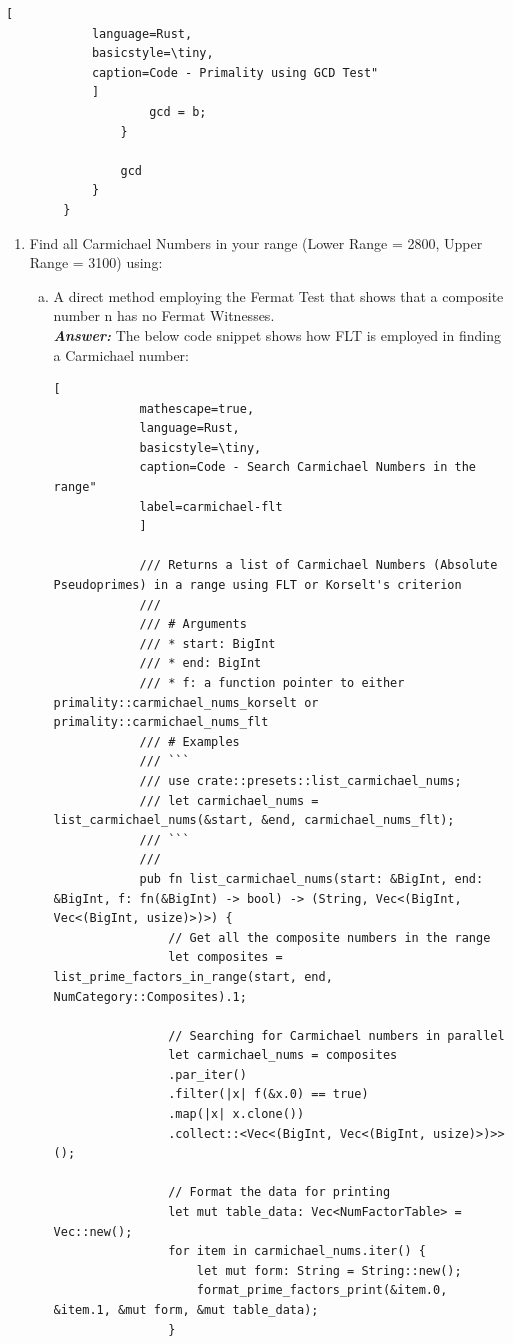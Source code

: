 \documentclass[11pt,a4paper]{article}
\begin{document}
\begin{enumerate}[1.]
\begin{flushleft}
\begin{lstlisting}[
			language=Rust, 
			basicstyle=\tiny, 
			caption=Code - Primality using GCD Test"  
			]
					gcd = b;
				}
				
				gcd
			}
		}
		\end{lstlisting}
		
		\end{flushleft}
		\bigskip
	
	\begin{enumerate}[2.]
		\item Find all Carmichael Numbers in your range (Lower Range = 2800, Upper Range = 3100) using:

	
	\begin{flushleft}
		\medskip
		\begin{enumerate}[(a)]
			\item A direct method employing the Fermat Test that shows that a composite number n has no Fermat Witnesses. \\
			\medskip
			\textbf{\textit{Answer:}} The below code snippet shows how FLT is employed in finding a Carmichael number:
		
			\begin{lstlisting}[
			mathescape=true,
			language=Rust, 
			basicstyle=\tiny,
			caption=Code - Search Carmichael Numbers in the range"
			label=carmichael-flt  
			]
			
			/// Returns a list of Carmichael Numbers (Absolute Pseudoprimes) in a range using FLT or Korselt's criterion
			///
			/// # Arguments
			/// * start: BigInt
			/// * end: BigInt
			/// * f: a function pointer to either primality::carmichael_nums_korselt or primality::carmichael_nums_flt
			/// # Examples
			/// ```
			/// use crate::presets::list_carmichael_nums;
			/// let carmichael_nums = list_carmichael_nums(&start, &end, carmichael_nums_flt);
			/// ```
			///
			pub fn list_carmichael_nums(start: &BigInt, end: &BigInt, f: fn(&BigInt) -> bool) -> (String, Vec<(BigInt, Vec<(BigInt, usize)>)>) {
				// Get all the composite numbers in the range
				let composites = list_prime_factors_in_range(start, end, NumCategory::Composites).1;
				
				// Searching for Carmichael numbers in parallel
				let carmichael_nums = composites
				.par_iter()
				.filter(|x| f(&x.0) == true)
				.map(|x| x.clone())
				.collect::<Vec<(BigInt, Vec<(BigInt, usize)>)>>();
				
				// Format the data for printing
				let mut table_data: Vec<NumFactorTable> = Vec::new();
				for item in carmichael_nums.iter() {
					let mut form: String = String::new();
					format_prime_factors_print(&item.0, &item.1, &mut form, &mut table_data);
				}
				

\end{lstlisting}
\end{enumerate}
\end{flushleft}
\end{enumerate}
\end{enumerate}
\end{document}
